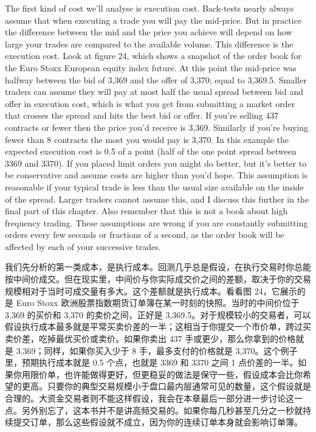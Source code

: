 \begin{englishblock} The first kind of cost we'll analyse is execution cost. Back-tests nearly always assume that when executing a trade you will pay the mid-price. But in practice the difference between the mid and the price you achieve will depend on how large your trades are compared to the available volume. This difference is the execution cost. Look at figure 24, which shows a snapshot of the order book for the Euro Stoxx European equity index future. At this point the mid-price was halfway between the bid of 3,369 and the offer of 3,370; equal to 3,369.5. Smaller traders can assume they will pay at most half the usual spread between bid and offer in execution cost, which is what you get from submitting a market order that crosses the spread and hits the best bid or offer. If you're selling 437 contracts or fewer then the price you'd receive is 3,369. Similarly if you're buying fewer than 8 contracts the most you would pay is 3,370. In this example the expected execution cost is 0.5 of a point (half of the one point spread between 3369 and 3370). If you placed limit orders you might do better, but it's better to be conservative and assume costs are higher than you'd hope. This assumption is reasonable if your typical trade is less than the usual size available on the inside of the spread. Larger traders cannot assume this, and I discuss this further in the final part of this chapter. Also remember that this is not a book about high frequency trading. These assumptions are wrong if you are constantly submitting orders every few seconds or fractions of a second, as the order book will be affected by each of your successive trades. \end{englishblock}

\begin{chineseblock}我们先分析的第一类成本，是执行成本。回测几乎总是假设，在执行交易时你总能按中间价成交。但在现实里，中间价与你实际成交价之间的差额，取决于你的交易规模相对于当时可成交量有多大。这个差额就是执行成本。看看图 24，它展示的是 Euro Stoxx 欧洲股票指数期货订单簿在某一时刻的快照。当时的中间价位于 3,369 的买价和 3,370 的卖价之间，正好是 3,369.5。对于规模较小的交易者，可以假设执行成本最多就是平常买卖价差的一半；这相当于你提交一个市价单，跨过买卖价差，吃掉最优买价或卖价。如果你卖出 437 手或更少，那么你拿到的价格就是 3,369；同样，如果你买入少于 8 手，最多支付的价格就是 3,370。这个例子里，预期执行成本就是 0.5 个点，也就是 3369 和 3370 之间 1 点价差的一半。如果你用限价单，也许能做得更好，但更稳妥的做法是保守一些，假设成本会比你希望的更高。只要你的典型交易规模小于盘口最内层通常可见的数量，这个假设就是合理的。大资金交易者则不能这样假设，我会在本章最后一部分进一步讨论这一点。另外别忘了，这本书并不是讲高频交易的。如果你每几秒甚至几分之一秒就持续提交订单，那么这些假设就不成立，因为你的连续订单本身就会影响订单簿。\end{chineseblock}

